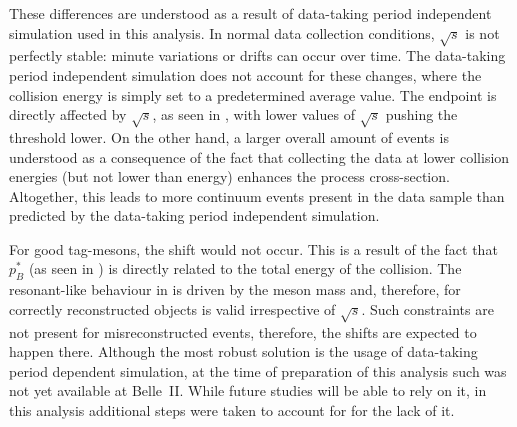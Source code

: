 These differences are understood as a result of data-taking period independent simulation used in this analysis.
In normal data collection conditions, $\sqrt{s}$ is not perfectly stable: minute variations or drifts can occur over time.
The data-taking period independent simulation does not account for these changes, where the collision energy is simply set to a predetermined average value.
The \Mbc endpoint is directly affected by $\sqrt{s}$, as seen in , with lower values of $\sqrt{s}$ pushing the \Mbc threshold lower.
On the other hand, a larger overall amount of \qqbar events is understood as a consequence of the fact that collecting the data at lower collision energies (but not lower than \FourS energy) enhances the \mbox{\epem\ra\qqbar} process cross-section.
Altogether, this leads to more continuum events present in the data sample than predicted by the data-taking period independent simulation.

For good tag-\B mesons, the shift would not occur.
This is a result of the fact that $p_B^*$ (as seen in ) is directly related to the total energy of the collision.
The resonant-like behaviour in \Mbc is driven by the \B meson mass and, therefore, for correctly reconstructed objects is valid irrespective of $\sqrt{s}$. 
Such constraints are not present for misreconstructed events, therefore, the shifts are expected to happen there.
Although the most robust solution is the usage of data-taking period dependent simulation, at the time of preparation of this analysis such \MC was not yet available at Belle~II.
While future studies will be able to rely on it, in this analysis additional steps were taken to account for for the lack of it.

